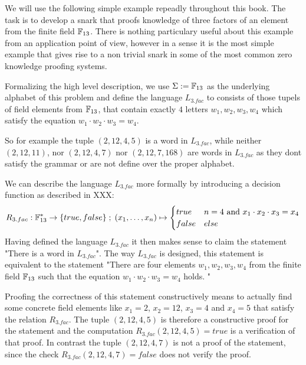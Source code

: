 \begin{example}[3-Factorization] We will use the following simple example repeadly throughout this book. The task is to develop a snark that proofs knowledge of three factors of an element from the finite field $\mathbb{F}_{13}$. There is nothing particulary useful about this example from an application point of view, however in a sense it is the most simple example that gives rise to a non trivial snark in some of the most common zero knowledge proofing systems. 

Formalizing the high level description, we use $\Sigma := \mathbb{F}_{13}$ as the underlying alphabet of this problem and define the language $L_{3.fac}$ to consists of those tupels of field elements from $\mathbb{F}_{13}$, that contain exactly $4$ letters $w_1,w_2,w_3,w_4$ which satisfy the equation $w_1\cdot w_2\cdot w_3 =w_4$.   

So for example the tuple $(2, 12, 4, 5)$ is a word in $L_{3.fac}$, while neither $(2, 12, 11)$, nor $(2, 12, 4, 7)$ nor $(2, 12, 7, 168)$ are words in $L_{3.fac}$ as they dont satisfy the grammar or are not define over the proper alphabet. 

We can describe the language $L_{3.fac}$ more formally by introducing a decision function as described in XXX:
$$
R_{3.fac} : \mathbb{F}_{13}^* \to \{true, false\}\;;\;
(x_1,\ldots,x_n) \mapsto
\begin{cases}
true & n=4 \text{ and } x_1\cdot x_2 \cdot x_3 = x_4\\
false & else
\end{cases}
$$
Having defined the language $L_{3.fac}$ it then makes sense to claim the statement "There is a word in $L_{3.fac}$". The way $L_{3.fac}$ is designed, this statement is equivalent to the statement "There are four elements $w_1,w_2,w_3,w_4$ from the finite field $\mathbb{F}_{13}$ such that the equation $w_1\cdot w_2\cdot w_3 =w_4$ holds. "

Proofing the correctness of this statement constructively means to actually find some concrete field elements like $x_1= 2$, $x_2 =12$, $x_3=4$ and $x_4 = 5$ that satisfy the relation $R_{3.fac}$. The tuple $(2,12,4,5)$ is therefore a constructive proof for the statement and the computation $R_{3.fac}(2,12,4,5)=true$ is a verification  of that proof. In contrast the tuple $(2, 12, 4, 7)$ is not a proof of the statement, since the check $R_{3.fac}(2,12,4,7)=false$ does not verify the proof.
\end{example}

